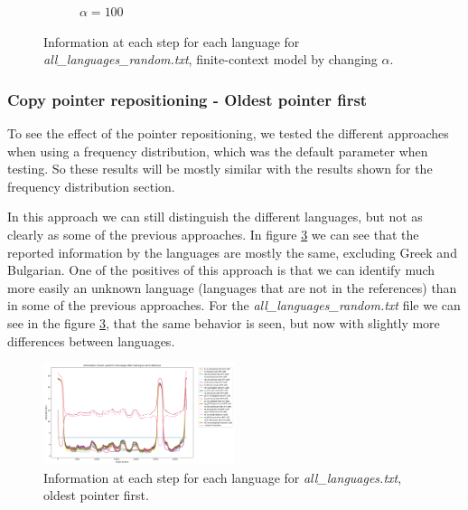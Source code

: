 \documentclass{article}
\begin{document}
\begin{figure}
\begin{subfigure}[b]{0.3\textwidth}
\begin{center}
        \end{center}
        \caption{$\alpha = 100$}
        \label{fig:all_languages_random_p_c:100:3}
    \end{subfigure}
    
    \caption{Information at each step for each language for \textit{all\_languages\_random.txt}, finite-context model by changing $\alpha$.}
    \label{fig:all_languages_random_p_c:alpha}
\end{figure}

\subsubsection{Copy pointer repositioning - Oldest pointer first}
\label{subsubsec:results_locate_lang_oldest_pointer_first}

To see the effect of the pointer repositioning, we tested the different approaches when using a frequency distribution, which was the default parameter when testing.
So these results will be mostly similar with the results shown for the frequency distribution section.

In this approach we can still distinguish the different languages, but not as clearly as some of the previous approaches.
In figure \ref{fig:all_languages_r_o} we can see that the reported information by the languages are mostly the same, excluding Greek and Bulgarian.
One of the positives of this approach is that we can identify much more easily an unknown language (languages that are not in the references) than in some of the previous approaches. %
For the \textit{all\_languages\_random.txt} file we can see in the figure \ref{fig:all_languages_r_o}, that the same behavior is seen, but now with slightly more differences between languages.

\begin{figure}
    \centering
    \includegraphics[width=0.5\textwidth]{../results/all_languages/-r_o.png}
    \caption{Information at each step for each language for \textit{all\_languages.txt}, oldest pointer first.}
    \label{fig:all_languages_r_o}
\end{figure}
\end{document}
